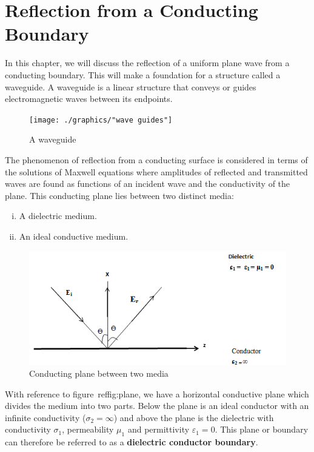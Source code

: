 \chapter{Reflection from a Conducting Boundary}\label{lec:lec34}
In this chapter, we will discuss the reflection of a uniform plane wave from a conducting boundary. This will make a foundation for a structure called a waveguide. A waveguide is a linear structure that conveys or guides electromagnetic waves between its endpoints.
\begin{figure}[h]
\centering
\texttt{[image: ./graphics/"wave guides"]}
\caption{A waveguide}
\end{figure}

The phenomenon of reflection from a conducting surface is considered in terms of the solutions of Maxwell equations where amplitudes of reflected and transmitted waves are found as functions of an incident wave and the conductivity of the plane. This conducting plane lies between two distinct media: 
\begin{enumerate}[(i)]
\item A dielectric medium.
\item An ideal conductive medium.
\end{enumerate}
\begin{figure}[h]
\centering
\includegraphics[width=1\linewidth]{./graphics/plane}
\caption{Conducting plane between two media}
\label{fig:plane}
\end{figure}

With reference to figure~ref{fig:plane}, we have a horizontal conductive plane which divides the medium into two parts. Below the plane is an ideal conductor with an infinite conductivity ($\sigma _2 =\infty$) and above the plane is the dielectric with conductivity $\sigma_1$, permeability $\mu _1$ and	permittivity $ \varepsilon _1 = 0 $. This plane or boundary can therefore be referred to as a \textbf{dielectric conductor boundary}.
 
